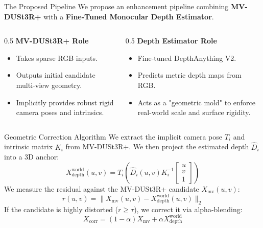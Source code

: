 \documentclass[aspectratio=169]{beamer}
\begin{document}
\begin{frame}{The Proposed Pipeline}
    We propose an enhancement pipeline combining \textbf{MV-DUSt3R+} with a \textbf{Fine-Tuned Monocular Depth Estimator}.
    \vspace{0.5cm}
    \begin{columns}
        \begin{column}{0.5\textwidth}
            \textbf{MV-DUSt3R+ Role}
            \begin{itemize}
                \item Takes sparse RGB inputs.
                \item Outputs initial candidate multi-view geometry.
                \item Implicitly provides robust rigid camera poses and intrinsics.
            \end{itemize}
        \end{column}
        \begin{column}{0.5\textwidth}
            \textbf{Depth Estimator Role}
            \begin{itemize}
                \item Fine-tuned DepthAnything V2.
                \item Predicts metric depth maps from RGB.
                \item Acts as a "geometric mold" to enforce real-world scale and surface rigidity.
            \end{itemize}
        \end{column}
    \end{columns}
\end{frame}

\begin{frame}{Geometric Correction Algorithm}
    We extract the implicit camera pose $T_i$ and intrinsic matrix $K_i$ from MV-DUSt3R+. We then project the estimated depth $\hat{D}_i$ into a 3D anchor:
    \begin{equation*}
        X_{\mathrm{depth}}^{\mathrm{world}}(u,v) = T_i \left( \hat{D}_i(u,v)K_i^{-1}\begin{bmatrix}u\\v\\1\end{bmatrix} \right)
    \end{equation*}
    \vspace{0.2cm}
    We measure the residual against the MV-DUSt3R+ candidate $X_{\mathrm{mv}}(u,v)$:
    \begin{equation*}
        r(u,v) = \| X_{\mathrm{mv}}(u,v) - X_{\mathrm{depth}}^{\mathrm{world}}(u,v) \|_2
    \end{equation*}
    \vspace{0.2cm}
    If the candidate is highly distorted ($r \geq \tau$), we correct it via alpha-blending:
    \begin{equation*}
        X_{\mathrm{corr}} = (1-\alpha)X_{\mathrm{mv}} + \alpha X_{\mathrm{depth}}^{\mathrm{world}}
    \end{equation*}
\end{frame}
\end{document}
